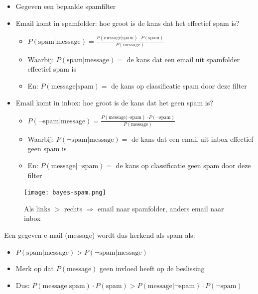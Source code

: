 \documentclass{article}
\begin{document}
\begin{itemize}
    \item Gegeven een bepaalde spamfilter
    \item Email komt in spamfolder: hoe groot is de kans dat het effectief spam is?
    \begin{itemize}
        \item $P(\text{spam} | \text{message}) = \frac{P(\text{message}|\text{spam}) \cdot P(\text{spam})}{P(\text{message})}$
        \item Waarbij: $P(\text{spam} | \text{message})=$ de kans dat een email uit spamfolder effectief spam is
        \item En: $P(\text{message}|\text{spam})=$ de kans op classificatie spam door deze filter
    \end{itemize}
    \item Email komt in inbox: hoe groot is de kans dat het geen spam is?
    \begin{itemize}
        \item $P(\neg \text{spam} | \text{message}) = \frac{P(\text{message}|\neg \text{spam}) \cdot P(\neg \text{spam})}{P(\text{message})}$
        \item Waarbij: $P(\neg \text{spam} | \text{message})=$ de kans dat een email uit inbox effectief geen spam is
        \item En: $P(\text{message}| \neg \text{spam})=$ de kans op classificatie geen spam door deze filter
    \end{itemize}
\end{itemize}

\begin{figure}[H]
    \centering
    \texttt{[image: bayes-spam.png]}
    \caption{Als links $>$ rechts $\Rightarrow$ email naar spamfolder, anders email naar inbox}
\end{figure}

Een gegeven e-mail (message) wordt dus herkend als spam als:

\begin{itemize}
    \item $P(\text{spam} | \text{message}) > P(\neg \text{spam} | \text{message})$
    \item Merk op dat $P(\text{message})$ geen invloed heeft op de beslissing
    \item Dus: $P(\text{message}|\text{spam}) \cdot P(\text{spam}) > P(\text{message}|\neg \text{spam}) \cdot P(\neg \text{spam})$
\end{itemize}
\end{document}
